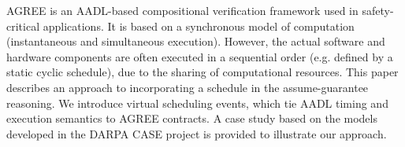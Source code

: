 AGREE is an AADL-based compositional verification framework used in safety-critical applications. It is based on a synchronous model of computation (instantaneous and simultaneous execution). However, the actual software and hardware components are often executed in a sequential order (e.g. defined by a static cyclic schedule), due to the sharing of computational resources. This paper describes an approach to incorporating a schedule in the assume-guarantee reasoning. We introduce virtual scheduling events, which tie AADL timing and execution semantics to AGREE contracts. A case study based on the models developed in the DARPA CASE project is provided to illustrate our approach.